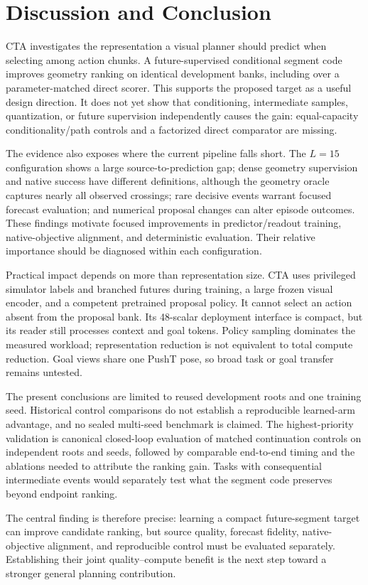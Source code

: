 \section{Discussion and Conclusion}
\label{sec:discussion}
CTA investigates the representation a visual planner should predict when selecting among action chunks. A future-supervised conditional segment code improves geometry ranking on identical development banks, including over a parameter-matched direct scorer. This supports the proposed target as a useful design direction. It does not yet show that conditioning, intermediate samples, quantization, or future supervision independently causes the gain: equal-capacity conditionality/path controls and a factorized direct comparator are missing.

The evidence also exposes where the current pipeline falls short. The $L=15$ configuration shows a large source-to-prediction gap; dense geometry supervision and native success have different definitions, although the geometry oracle captures nearly all observed crossings; rare decisive events warrant focused forecast evaluation; and numerical proposal changes can alter episode outcomes. These findings motivate focused improvements in predictor/readout training, native-objective alignment, and deterministic evaluation. Their relative importance should be diagnosed within each configuration.

Practical impact depends on more than representation size. CTA uses privileged simulator labels and branched futures during training, a large frozen visual encoder, and a competent pretrained proposal policy. It cannot select an action absent from the proposal bank. Its 48-scalar deployment interface is compact, but its reader still processes context and goal tokens. Policy sampling dominates the measured workload; representation reduction is not equivalent to total compute reduction. Goal views share one PushT pose, so broad task or goal transfer remains untested.

The present conclusions are limited to reused development roots and one training seed. Historical control comparisons do not establish a reproducible learned-arm advantage, and no sealed multi-seed benchmark is claimed. The highest-priority validation is canonical closed-loop evaluation of matched continuation controls on independent roots and seeds, followed by comparable end-to-end timing and the ablations needed to attribute the ranking gain. Tasks with consequential intermediate events would separately test what the segment code preserves beyond endpoint ranking.

The central finding is therefore precise: learning a compact future-segment target can improve candidate ranking, but source quality, forecast fidelity, native-objective alignment, and reproducible control must be evaluated separately. Establishing their joint quality--compute benefit is the next step toward a stronger general planning contribution.
